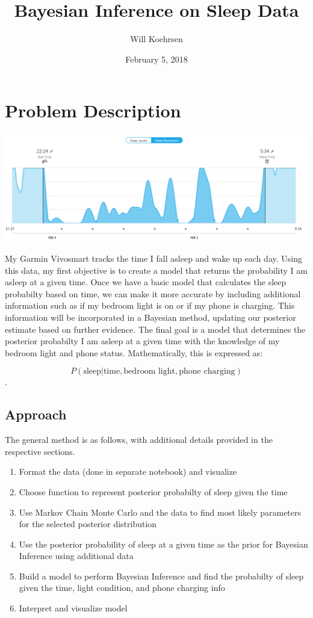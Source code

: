 \documentclass[12pt]{article}
\title{Bayesian Inference on Sleep Data}
\author{Will Koehrsen}
\date{February 5, 2018}
\makeatletter
\def\maxwidth{\ifdim\Gin@nat@width>\linewidth\linewidth
    \else\Gin@nat@width\fi}
\let\Oldincludegraphics\includegraphics
\renewcommand{\includegraphics}[1]{\Oldincludegraphics[width=.8\maxwidth]{#1}}
\providecommand{\tightlist}{%
      \setlength{\itemsep}{0pt}\setlength{\parskip}{0pt}}
\makeatother
\begin{document}
    
    
    \maketitle
    \tableofcontents
    
    
    \section{Problem Description}\label{problem-description}

\includegraphics{images/sleep_data_graph.PNG}

My Garmin Vivosmart tracks the time I fall asleep and wake up each day.
Using this data, my first objective is to create a model that returns
the probability I am asleep at a given time. Once we have a basic model
that calculates the sleep probabilty based on time, we can make it more
accurate by including additional information such as if my bedroom light
is on or if my phone is charging. This information will be incorporated
in a Bayesian method, updating our posterior estimate based on further
evidence. The final goal is a model that determines the posterior
probabilty I am asleep at a given time with the knowledge of my bedroom
light and phone status. Mathematically, this is expressed as:

\[P(\text{sleep} | \text{time}, \text{bedroom light}, \text{phone charging})\].

    \subsection{Approach}\label{approach}

The general method is as follows, with additional details provided in
the respective sections.

\begin{enumerate}
\def\labelenumi{\arabic{enumi}.}
\tightlist
\item
  Format the data (done in separate notebook) and visualize
\item
  Choose function to represent posterior probabilty of sleep given the
  time
\item
  Use Markov Chain Monte Carlo and the data to find most likely
  parameters for the selected posterior distribution
\item
  Use the posterior probability of sleep at a given time as the prior
  for Bayesian Inference using additional data
\item
  Build a model to perform Bayesian Inference and find the probabilty of
  sleep given the time, light condition, and phone charging info
\item
  Interpret and visualize model
\end{enumerate}
\end{document}

